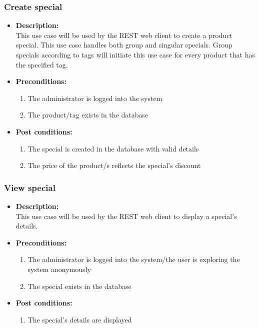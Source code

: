 \documentclass[a4paper,10pt]{article}
\begin{document}
\subsubsection{Create special}
\begin{itemize}
	\item \textbf {Description:}\\
	This use case will be used by the REST web client to create a product special. This use case handles both group and singular specials. Group specials 			according to tags will initiate this use case for every product that has the specified tag.
	\item \textbf {Preconditions:}
		\begin{enumerate}
			\item The administrator is logged into the system
			\item The product/tag exists in the database
		\end{enumerate}
	\item \textbf {Post conditions:}
		\begin{enumerate}
			\item The special is created in the database with valid details
			\item The price of the product/s reflects the special’s discount
		\end{enumerate}
\end{itemize}
\subsubsection{View special}
\begin{itemize}
	\item \textbf {Description:}\\
	This use case will be used by the REST web client to display a special’s details.
	\item \textbf {Preconditions:}
		\begin{enumerate}
			\item The administrator is logged into the system/the user is exploring the system anonymously
			\item The special exists in the database
		\end{enumerate}
	\item \textbf {Post conditions:}
		\begin{enumerate}
			\item The special’s details are displayed
		\end{enumerate}
\end{itemize}
\end{document}
